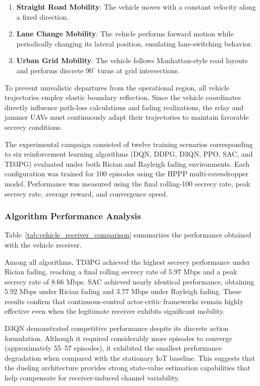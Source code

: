 \documentclass[journal,onecolumn]{IEEEtran}
\begin{document}
\begin{enumerate}
    \item \textbf{Straight Road Mobility}: The vehicle moves with a constant velocity along a fixed direction.
    \item \textbf{Lane Change Mobility}: The vehicle performs forward motion while periodically changing its lateral position, emulating lane-switching behavior.
    \item \textbf{Urban Grid Mobility}: The vehicle follows Manhattan-style road layouts and performs discrete $90^\circ$ turns at grid intersections.
\end{enumerate}

To prevent unrealistic departures from the operational region, all vehicle trajectories employ elastic boundary reflection. Since the vehicle coordinates directly influence path-loss calculations and fading realizations, the relay and jammer UAVs must continuously adapt their trajectories to maintain favorable secrecy conditions.

The experimental campaign consisted of twelve training scenarios corresponding to six reinforcement learning algorithms (DQN, DDPG, D3QN, PPO, SAC, and TD3PG) evaluated under both Rician and Rayleigh fading environments. Each configuration was trained for 100 episodes using the HPPP multi-eavesdropper model. Performance was measured using the final rolling-100 secrecy rate, peak secrecy rate, average reward, and convergence speed.

\subsubsection{Algorithm Performance Analysis}

Table~\ref{tab:vehicle_receiver_comparison} summarizes the performance obtained with the vehicle receiver.

Among all algorithms, TD3PG achieved the highest secrecy performance under Rician fading, reaching a final rolling secrecy rate of $5.97$ Mbps and a peak secrecy rate of $8.66$ Mbps. SAC achieved nearly identical performance, obtaining $5.92$ Mbps under Rician fading and $3.77$ Mbps under Rayleigh fading. These results confirm that continuous-control actor-critic frameworks remain highly effective even when the legitimate receiver exhibits significant mobility.

D3QN demonstrated competitive performance despite its discrete action formulation. Although it required considerably more episodes to converge (approximately 55--57 episodes), it exhibited the smallest performance degradation when compared with the stationary IoT baseline. This suggests that the dueling architecture provides strong state-value estimation capabilities that help compensate for receiver-induced channel variability.
\end{document}
